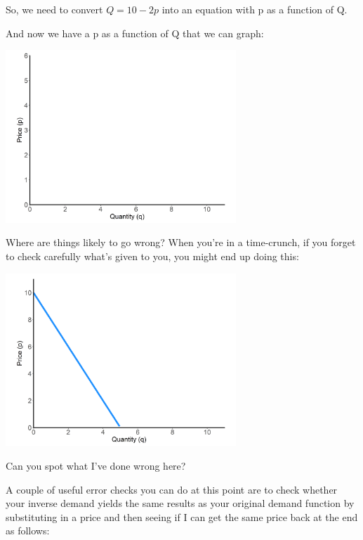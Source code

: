 \documentclass[11pt,]{article}
\begin{document}
So, we need to convert \(Q=10-2p\) into an equation with p as a function
of Q.

\vspace{10cm}

And now we have a p as a function of Q that we can graph:

\begin{center}
\includegraphics[width=0.65\textwidth]{../images/eq_blank.png}
\end{center}

Where are things likely to go wrong? When you're in a time-crunch, if
you forget to check carefully what's given to you, you might end up
doing this:

\begin{center}
\includegraphics[width=0.65\textwidth]{../images/eq_wrong.png}
\end{center}

Can you spot what I've done wrong here?

A couple of useful error checks you can do at this point are to check
whether your inverse demand yields the same results as your original
demand function by substituting in a price and then seeing if I can get
the same price back at the end as follows:

\vspace{10cm}
\end{document}
